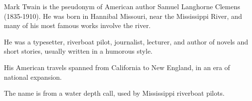 \documentclass[../demo.tex]{novelettesubdoc}
\begin{document}
\begin{upperpage}
\null\null\null\null\null
{}
\null\null\null\null\null
\end{upperpage}

Mark Twain is the pseudonym of American author Samuel Langhorne Clemens (1835-1910).
He was born in Hannibal Missouri, near the Mississippi River, and many of
his most famous works involve the river.

He was a typesetter, riverboat pilot, journalist, lecturer, and author of
novels and short stories, usually written in a humorous style.

His American travels spanned from California to New England, in an era of
national expansion.

The name  is from a water depth call, used by
Mississippi riverboat pilots.
\end{document}
